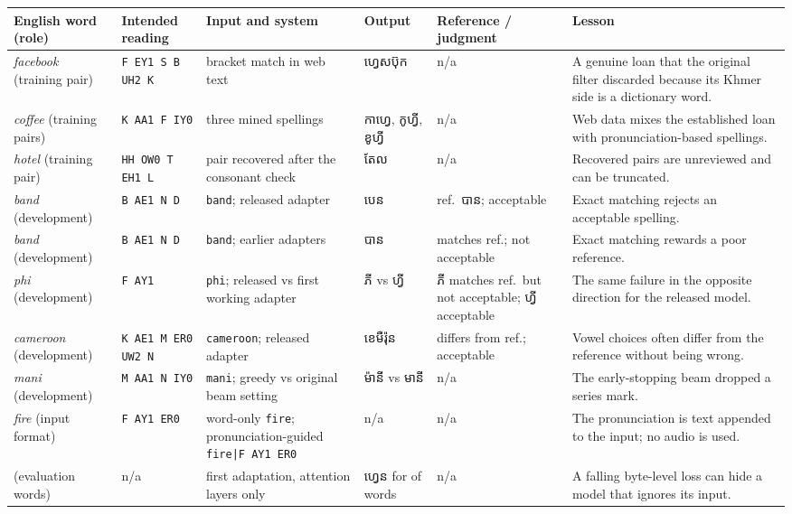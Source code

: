 \documentclass[10pt,a4paper,twocolumn]{article}
\newcommand{\km}[1]{{\khmerfont #1}}
\begin{document}
\begin{table}[H]
\centering\small
\renewcommand{\arraystretch}{1.15}
\begin{tabularx}{\textwidth}{@{}>{\raggedright\arraybackslash}p{2.0cm}>{\raggedright\arraybackslash}p{2.1cm}
  >{\raggedright\arraybackslash}p{2.9cm}>{\raggedright\arraybackslash}p{2.0cm}>{\raggedright\arraybackslash}p{2.3cm}L@{}}
\toprule
English word (role) & Intended reading & Input and system & Output & Reference / judgment & Lesson \\
\midrule
\emph{facebook} (training pair) & \texttt{F EY1 S B UH2 K} & bracket match in web text &
  \km{ហ្វេសប៊ុក} & n/a & A genuine loan that the original filter discarded because its Khmer side is a dictionary
  word. \\
\emph{coffee} (training pairs) & \texttt{K AA1 F IY0} & three mined spellings &
  \km{កាហ្វេ}, \km{កូហ្វី}, \km{ខូហ្វី} & n/a & Web data mixes the established loan with pronunciation-based
  spellings. \\
\emph{hotel} (training pair) & \texttt{HH OW0 T EH1 L} & pair recovered after the consonant check &
  \km{តែល} & n/a & Recovered pairs are unreviewed and can be truncated. \\
\emph{band} (development) & \texttt{B AE1 N D} & \texttt{band}; released adapter & \km{បេន} & ref.\ \km{បាន};
  acceptable & Exact matching rejects an acceptable spelling. \\
\emph{band} (development) & \texttt{B AE1 N D} & \texttt{band}; earlier adapters & \km{បាន} & matches ref.;
  not acceptable & Exact matching rewards a poor reference. \\
\emph{phi} (development) & \texttt{F AY1} & \texttt{phi}; released vs first working adapter & \km{ភី} vs \km{ហ្វី} &
  \km{ភី} matches ref.\ but not acceptable; \km{ហ្វី} acceptable & The same failure in the opposite direction for
  the released model. \\
\emph{cameroon} (development) & \texttt{K AE1 M ER0 UW2 N} & \texttt{cameroon}; released adapter & \km{ខេមឺរ៉ុន} & differs from ref.;
  acceptable & Vowel choices often differ from the reference without being wrong. \\
\emph{mani} (development) & \texttt{M AA1 N IY0} & \texttt{mani}; greedy vs original beam setting & \km{ម៉ានី} vs \km{មានី} & n/a
  & The early-stopping beam dropped a series mark. \\
\emph{fire} (input format) & \texttt{F AY1 ER0} & word-only \texttt{fire}; pronunciation-guided
  \texttt{fire|F AY1 ER0} & n/a & n/a & The pronunciation is text appended to the input; no audio is used. \\
(evaluation words) & n/a & first adaptation, attention layers only & \km{ហ្វេន} for  of
   words & n/a & A falling byte-level loss can hide a model that ignores its input. \\
\bottomrule
\end{tabularx}
\end{table}
\end{document}
